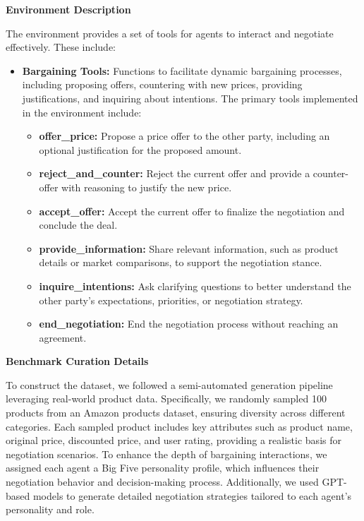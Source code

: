 \textbf{Environment Description}

The environment provides a set of tools for agents to interact and negotiate effectively. These include:
\begin{itemize}
    \item \textbf{Bargaining Tools:} Functions to facilitate dynamic bargaining processes, including proposing offers, countering with new prices, providing justifications, and inquiring about intentions. The primary tools implemented in the environment include: 
    \begin{itemize}
        \item \textbf{offer\_price:} Propose a price offer to the other party, including an optional justification for the proposed amount.

        \item \textbf{reject\_and\_counter:} Reject the current offer and provide a counter-offer with reasoning to justify the new price.
        
        \item \textbf{accept\_offer:} Accept the current offer to finalize the negotiation and conclude the deal.
        
        \item \textbf{provide\_information:} Share relevant information, such as product details or market comparisons, to support the negotiation stance.
        
        \item \textbf{inquire\_intentions:} Ask clarifying questions to better understand the other party’s expectations, priorities, or negotiation strategy.
        
        \item \textbf{end\_negotiation:} End the negotiation process without reaching an agreement.
    \end{itemize}
\end{itemize}

\textbf{Benchmark Curation Details}

To construct the dataset, we followed a semi-automated generation pipeline leveraging real-world product data. Specifically, we randomly sampled 100 products from an Amazon products dataset\cite{asaniczka_2023}, ensuring diversity across different categories. Each sampled product includes key attributes such as product name, original price, discounted price, and user rating, providing a realistic basis for negotiation scenarios. To enhance the depth of bargaining interactions, we assigned each agent a Big Five personality profile, which influences their negotiation behavior and decision-making process. Additionally, we used GPT-based models to generate detailed negotiation strategies tailored to each agent’s personality and role. 

